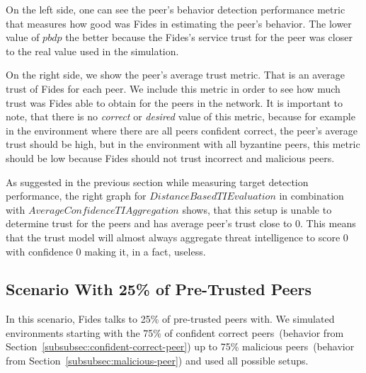 On the left side, one can see the peer's behavior detection performance metric that measures how good was Fides in estimating the peer's behavior. The lower value of $pbdp$ the better because the Fides's service trust for the peer was closer to the real value used in the simulation.

On the right side, we show the peer's average trust metric. That is an average trust of Fides for each peer. We include this metric in order to see how much trust was Fides able to obtain for the peers in the network.
It is important to note, that there is no \textit{correct} or \textit{desired} value of this metric, because for example in the environment where there are all peers confident correct, the peer's average trust should be high, but in the environment with all byzantine peers, this metric should be low because Fides should not trust incorrect and malicious peers.

As suggested in the previous section while measuring target detection performance, the right graph for $DistanceBasedTIEvaluation$ in combination with $AverageConfidenceTIAggregation$ shows, that this setup is unable to determine trust for the peers and has average peer's trust close to $0$. This means that the trust model will almost always aggregate threat intelligence to score $0$ with confidence $0$ making it, in a fact, useless. 

\cleartoleftpage
\subsection{Scenario With 25\% of Pre-Trusted Peers}
\label{subsec:scenario-with-25-pretrusted-peers}

In this scenario, Fides talks to 25\% of pre-trusted peers with. We simulated environments starting with the 75\% of confident correct peers~(behavior from Section~\ref{subsubsec:confident-correct-peer}) up to 75\% malicious peers~(behavior from Section~\ref{subsubsec:malicious-peer}) and used all possible setups.


